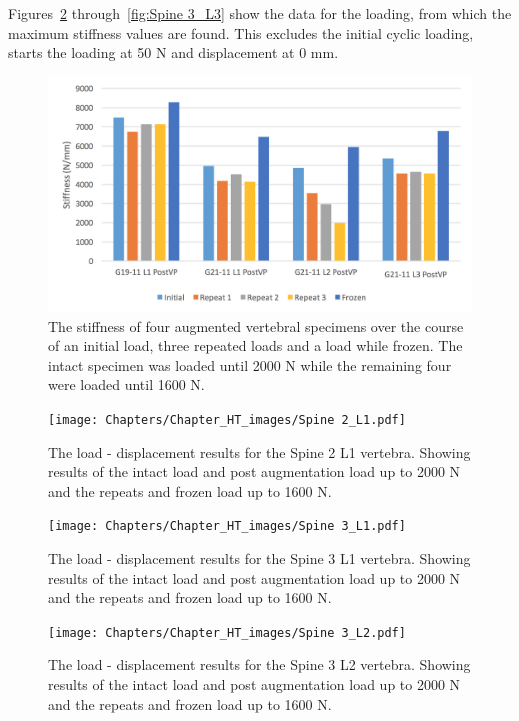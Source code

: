 Figures~\ref{fig:Spine 2_L1} through~\ref{fig:Spine 3_L3} show the data for the
loading, from which the maximum stiffness values are found. This excludes the
initial cyclic loading, starts the loading at 50 N and displacement at 0 mm.

\begin{figure}[!h]
  \centering
  \includegraphics[width=6in]{Chapters/Chapter_HT_images/experimental_repeats.png}
  \caption{The stiffness of four augmented vertebral specimens over the course
    of an initial load, three repeated loads and a load while frozen. The intact
    specimen was loaded until 2000 N while the remaining four were loaded until
    1600 N.}
  \label{fig:exp_repeats}
\end{figure}


\begin{figure}[ht!]
  \centering
  \texttt{[image: Chapters/Chapter\_HT\_images/Spine 2\_L1.pdf]}
  \caption{The load - displacement results for the Spine 2 L1 vertebra. Showing
    results of the intact load and post augmentation load up to 2000 N and the
    repeats and frozen load up to 1600 N.}
  \label{fig:Spine 2_L1}
\end{figure}

\begin{figure}[ht!]
  \centering
  \texttt{[image: Chapters/Chapter\_HT\_images/Spine 3\_L1.pdf]}
  \caption{The load - displacement results for the Spine 3 L1 vertebra. Showing
    results of the intact load and post augmentation load up to 2000 N and the
    repeats and frozen load up to 1600 N.}
  \label{fig:Spine 3_L1}
\end{figure}

\begin{figure}[ht!]
  \centering
  \texttt{[image: Chapters/Chapter\_HT\_images/Spine 3\_L2.pdf]}
  \caption{The load - displacement results for the Spine 3 L2 vertebra. Showing
    results of the intact load and post augmentation load up to 2000 N and the
    repeats and frozen load up to 1600 N.}
  \label{fig:Spine 3_L2}
\end{figure}

